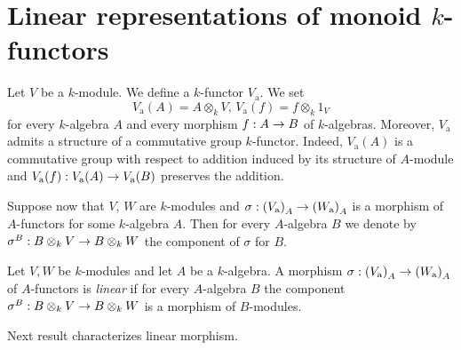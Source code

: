 \section{Linear representations of monoid $k$-functors}

\begin{example}\label{example:additivekfunctor}
Let $V$ be a $k$-module. We define a $k$-functor $V_{\mathrm{a}}$. We set
$$V_{\mathrm{a}}(A) = A\otimes_kV,\,V_{\mathrm{a}}(f) = f\otimes_k1_V$$
for every $k$-algebra $A$ and every morphism $f:A\rightarrow B$ of $k$-algebras. Moreover, $V_{\mathrm{a}}$ admits a structure of a commutative group $k$-functor. Indeed, $V_{\mathrm{a}}(A)$ is a commutative group with respect to addition induced by its structure of $A$-module and $V_{\mathrm{a}}(f):V_{\mathrm{a}}(A)\rightarrow V_{\mathrm{a}}(B)$ preserves the addition.
\end{example}
\noindent
Suppose now that $V$, $W$ are $k$-modules and $\sigma:\left(V_{\mathrm{a}}\right)_A\rightarrow \left(W_{\mathrm{a}}\right)_A$ is a morphism of $A$-functors for some $k$-algebra $A$. Then for every $A$-algebra $B$ we denote by $\sigma^B:B\otimes_kV\rightarrow B\otimes_kW$ the component of $\sigma$ for $B$.

\begin{definition}
Let $V,W$ be $k$-modules and let $A$ be a $k$-algebra. A morphism $\sigma:\left(V_{\mathrm{a}}\right)_A\rightarrow \left(W_{\mathrm{a}}\right)_A$ of $A$-functors is \textit{linear} if for every $A$-algebra $B$ the component $\sigma^B:B\otimes_kV\rightarrow B\otimes_kW$ is a morphism of $B$-modules.
\end{definition}
\noindent
Next result characterizes linear morphism.

